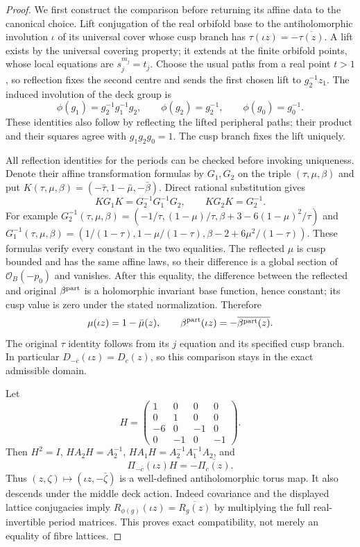 \begin{proof}
We first construct the comparison before returning its affine data to the canonical choice. Lift conjugation of the real orbifold base to the antiholomorphic involution $\iota$ of its universal cover whose cusp branch has $\tau(\iota z)=-\overline{\tau(z)}$. A lift exists by the universal covering property; it extends at the finite orbifold points, whose local equations are $s_j^{m_j}=t_j$. Choose the usual paths from a real point $t>1$, so reflection fixes the second centre and sends the first chosen lift to $g_2^{-1}z_1$. The induced involution of the deck group is
\[
 \phi(g_1)=g_2^{-1}g_1^{-1}g_2,\qquad
 \phi(g_2)=g_2^{-1},\qquad \phi(g_0)=g_0^{-1}.
\]
These identities also follow by reflecting the lifted peripheral paths; their product and their squares agree with $g_1g_2g_0=1$. The cusp branch fixes the lift uniquely.

All reflection identities for the periods can be checked before invoking uniqueness. Denote their affine transformation formulas by $G_1,G_2$ on the triple $(\tau,\mu,\beta)$ and put $K(\tau,\mu,\beta)=(-\bar\tau,1-\bar\mu,-\bar\beta)$. Direct rational substitution gives
\[
 KG_1K=G_2^{-1}G_1^{-1}G_2,\qquad KG_2K=G_2^{-1}.
\]
For example $G_2^{-1}(\tau,\mu,\beta)=(-1/\tau,(1-\mu)/\tau,\beta+3-6(1-\mu)^2/\tau)$ and
$G_1^{-1}(\tau,\mu,\beta)=(1/(1-\tau),1-\mu/(1-\tau),\beta-2+6\mu^2/(1-\tau))$. These formulas verify every constant in the two equalities. The reflected $\mu$ is cusp bounded and has the same affine laws, so their difference is a global section of $\mathcal O_B(-p_0)$ and vanishes. After this equality, the difference between the reflected and original $\beta^{\rm part}$ is a holomorphic invariant base function, hence constant; its cusp value is zero under the stated normalization. Therefore
\[
 \mu(\iota z)=1-\bar\mu(z),\qquad
 \beta^{\rm part}(\iota z)=-\overline{\beta^{\rm part}(z)}.
\]
The original $\tau$ identity follows from its $j$ equation and its specified cusp branch. In particular $D_{-\bar c}(\iota z)=D_c(z)$, so this comparison stays in the exact admissible domain.

Let
\[
 H=\begin{pmatrix}1&0&0&0\\0&1&0&0\\-6&0&-1&0\\0&-1&0&-1\end{pmatrix}.
\]
Then $H^2=I$, $HA_2H=A_2^{-1}$, $HA_1H=A_2^{-1}A_1^{-1}A_2$, and
\[
 \Pi_{-\bar c}(\iota z)H=-\overline{\Pi_c(z)}.
\]
Thus $(z,\zeta)\mapsto(\iota z,-\bar\zeta)$ is a well-defined antiholomorphic torus map. It also descends under the middle deck action. Indeed covariance and the displayed lattice conjugacies imply $R_{\phi(g)}(\iota z)=\overline{R_g(z)}$ by multiplying the full real-invertible period matrices. This proves exact compatibility, not merely an equality of fibre lattices.


\end{proof}
